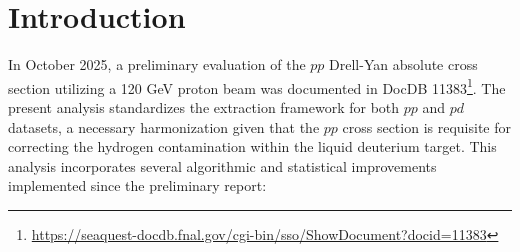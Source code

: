 \documentclass[11pt]{article}
\begin{document}
\clearpage

\tableofcontents
\clearpage
\listoffigures
\clearpage
\listoftables
\clearpage


\section{Introduction}
\label{sec:introduction}
In October 2025, a preliminary evaluation of the $pp$ Drell-Yan absolute cross section utilizing a 120 GeV proton beam was documented in DocDB 11383\footnote{\url{https://seaquest-docdb.fnal.gov/cgi-bin/sso/ShowDocument?docid=11383}}. The present analysis standardizes the extraction framework for both $pp$ and $pd$ datasets, a necessary harmonization given that the $pp$ cross section is requisite for correcting the hydrogen contamination within the liquid deuterium target.  This analysis incorporates several algorithmic and statistical improvements implemented since the preliminary report:
\end{document}
